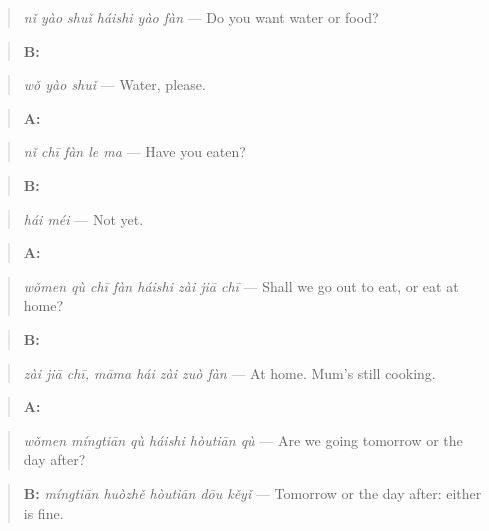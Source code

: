 \begin{quote}
\emph{nǐ yào shuǐ háishi yào fàn} — Do you want water or food?
\end{quote}

\begin{quote}
\textbf{B:} 
\end{quote}

\begin{quote}
\emph{wǒ yào shuǐ} — Water, please.
\end{quote}

\begin{quote}
\textbf{A:} 
\end{quote}

\begin{quote}
\emph{nǐ chī fàn le ma} — Have you eaten?
\end{quote}

\begin{quote}
\textbf{B:} 
\end{quote}

\begin{quote}
\emph{hái méi} — Not yet.
\end{quote}

\begin{quote}
\textbf{A:} 
\end{quote}

\begin{quote}
\emph{wǒmen qù chī fàn háishi zài jiā chī} — Shall we go out to eat, or eat at home?
\end{quote}

\begin{quote}
\textbf{B:}  
\end{quote}

\begin{quote}
\emph{zài jiā chī, māma hái zài zuò fàn} — At home. Mum's still cooking.
\end{quote}

\begin{quote}
\textbf{A:} 
\end{quote}

\begin{quote}
\emph{wǒmen míngtiān qù háishi hòutiān qù} — Are we going tomorrow or the day after?
\end{quote}

\begin{quote}
\textbf{B:} \emph{míngtiān huòzhě hòutiān dōu kěyǐ} — Tomorrow or the day after: either is fine.
\end{quote}

